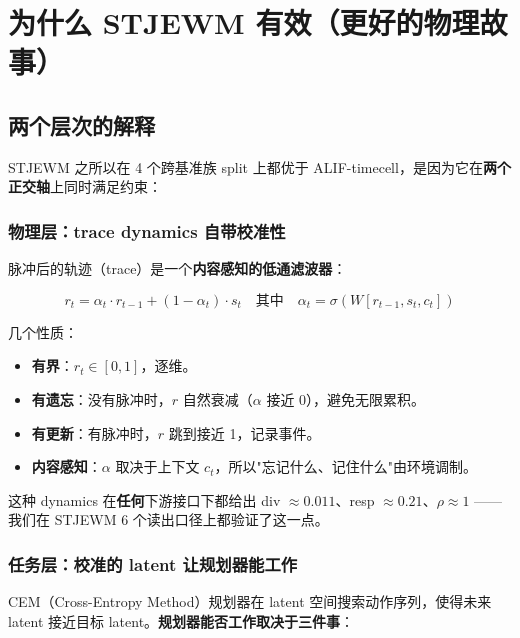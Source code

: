 \documentclass[11pt,a4paper]{article}
\begin{document}
\section{为什么 STJEWM 有效（更好的物理故事）}

\subsection{两个层次的解释}

STJEWM 之所以在 4 个跨基准族 split 上都优于 ALIF-timecell，是因为它在\textbf{两个正交轴}上同时满足约束：

\subsubsection{物理层：trace dynamics 自带校准性}

脉冲后的轨迹（trace）是一个\textbf{内容感知的低通滤波器}：

\[
r_t = \alpha_t \cdot r_{t-1} + (1 - \alpha_t) \cdot s_t
\quad \text{其中} \quad
\alpha_t = \sigma(W[r_{t-1}, s_t, c_t])
\]

几个性质：

\begin{itemize}[leftmargin=2em]
    \item \textbf{有界}：$r_t \in [0, 1]$，逐维。
    \item \textbf{有遗忘}：没有脉冲时，$r$ 自然衰减（$\alpha$ 接近 0），避免无限累积。
    \item \textbf{有更新}：有脉冲时，$r$ 跳到接近 1，记录事件。
    \item \textbf{内容感知}：$\alpha$ 取决于上下文 $c_t$，所以"忘记什么、记住什么"由环境调制。
\end{itemize}

这种 dynamics 在\textbf{任何}下游接口下都给出 div $\approx 0.011$、resp $\approx 0.21$、$\rho \approx 1$ —— 我们在 STJEWM 6 个读出口径上都验证了这一点。

\subsubsection{任务层：校准的 latent 让规划器能工作}

CEM（Cross-Entropy Method）规划器在 latent 空间搜索动作序列，使得未来 latent 接近目标 latent。\textbf{规划器能否工作取决于三件事}：
\end{document}
